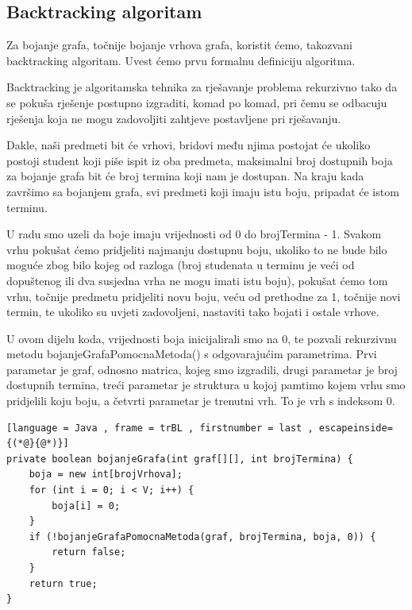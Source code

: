 \documentclass[times, utf8, zavrsni, numeric]{fer}
\begin{document}
\subsection*{Backtracking algoritam}
Za bojanje grafa, točnije bojanje vrhova grafa, koristit ćemo, takozvani backtracking algoritam. Uvest ćemo prvu formalnu definiciju algoritma.\par
Backtracking je algoritamska tehnika za rješavanje problema rekurzivno tako da se pokuša rješenje postupno izgraditi, komad po komad, pri čemu se odbacuju rješenja koja ne mogu zadovoljiti zahtjeve postavljene pri rješavanju.\par
Dakle, naši predmeti bit će vrhovi, bridovi među njima postojat će ukoliko postoji student koji piše ispit iz oba predmeta, maksimalni broj dostupnih boja za bojanje grafa bit će broj termina koji nam je dostupan. Na kraju kada završimo sa bojanjem grafa, svi predmeti koji imaju istu boju, pripadat će istom terminu.\par
U radu smo uzeli da boje imaju vrijednosti od 0 do brojTermina - 1. Svakom vrhu pokušat ćemo pridjeliti najmanju dostupnu boju, ukoliko to ne bude bilo moguće zbog bilo kojeg od razloga (broj studenata u terminu je veći od dopuštenog ili dva susjedna vrha ne mogu imati istu boju), pokušat ćemo tom vrhu, točnije predmetu pridjeliti novu boju, veću od prethodne za 1, točnije novi termin, te ukoliko su uvjeti zadovoljeni, nastaviti tako bojati i ostale vrhove.\par
U ovom dijelu koda, vrijednosti boja inicijalirali smo na 0, te pozvali rekurzivnu metodu bojanjeGrafaPomocnaMetoda() s odgovarajućim parametrima. Prvi parametar je graf, odnosno matrica, kojeg smo izgradili, drugi parametar je broj dostupnih termina, treći parametar je struktura u kojoj pamtimo kojem vrhu smo pridjelili koju boju, a četvrti parametar je trenutni vrh. To je vrh s indeksom 0.
   
\begin{lstlisting}[language = Java , frame = trBL , firstnumber = last , escapeinside={(*@}{@*)}]
private boolean bojanjeGrafa(int graf[][], int brojTermina) {
	boja = new int[brojVrhova];
	for (int i = 0; i < V; i++) {
		boja[i] = 0;
	}
	if (!bojanjeGrafaPomocnaMetoda(graf, brojTermina, boja, 0)) {
		return false;
	}
	return true;
}
\end{lstlisting}
\end{document}
